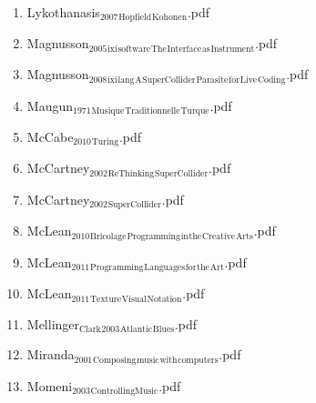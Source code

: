 \documentclass[11pt]{article}
\begin{document}
\begin{enumerate}
\begin{enumerate}
\begin{enumerate}
\begin{enumerate}
\begin{enumerate}
\item Lykothanasis$_{\text{2007}}$$_{\text{Hopfield}}$$_{\text{Kohonen}}$.pdf
\label{sec-1-1-1-1-7-1-1-62}

\item Magnusson$_{\text{2005}}$$_{\text{ixi}}$$_{\text{software}}$$_{\text{The}}$$_{\text{Interface}}$$_{\text{as}}$$_{\text{Instrument}}$.pdf
\label{sec-1-1-1-1-7-1-1-63}

\item Magnusson$_{\text{2008}}$$_{\text{ixi}}$$_{\text{lang}}$$_{\text{A}}$$_{\text{SuperCollider}}$$_{\text{Parasite}}$$_{\text{for}}$$_{\text{Live}}$$_{\text{Coding}}$.pdf
\label{sec-1-1-1-1-7-1-1-64}

\item Maugun$_{\text{1971}}$$_{\text{Musique}}$$_{\text{Traditionnelle}}$$_{\text{Turque}}$.pdf
\label{sec-1-1-1-1-7-1-1-65}

\item McCabe$_{\text{2010}}$$_{\text{Turing}}$.pdf
\label{sec-1-1-1-1-7-1-1-66}

\item McCartney$_{\text{2002}}$$_{\text{ReThinking}}$$_{\text{SuperCollider}}$.pdf
\label{sec-1-1-1-1-7-1-1-67}

\item McCartney$_{\text{2002}}$$_{\text{SuperCollider}}$.pdf
\label{sec-1-1-1-1-7-1-1-68}

\item McLean$_{\text{2010}}$$_{\text{Bricolage}}$$_{\text{Programming}}$$_{\text{in}}$$_{\text{the}}$$_{\text{Creative}}$$_{\text{Arts}}$.pdf
\label{sec-1-1-1-1-7-1-1-69}

\item McLean$_{\text{2011}}$$_{\text{Programming}}$$_{\text{Languages}}$$_{\text{for}}$$_{\text{the}}$$_{\text{Art}}$.pdf
\label{sec-1-1-1-1-7-1-1-70}

\item McLean$_{\text{2011}}$$_{\text{Texture}}$$_{\text{Visual}}$$_{\text{Notation}}$.pdf
\label{sec-1-1-1-1-7-1-1-71}

\item Mellinger$_{\text{Clark}}$$_{\text{2003}}$$_{\text{Atlantic}}$$_{\text{Blues}}$.pdf
\label{sec-1-1-1-1-7-1-1-72}

\item Miranda$_{\text{2001}}$$_{\text{Composing}}$$_{\text{music}}$$_{\text{with}}$$_{\text{computers}}$.pdf
\label{sec-1-1-1-1-7-1-1-73}

\item Momeni$_{\text{2003}}$$_{\text{ControllingMusic}}$.pdf
\label{sec-1-1-1-1-7-1-1-74}


\end{enumerate}
\end{enumerate}
\end{enumerate}
\end{enumerate}
\end{enumerate}
\end{document}
